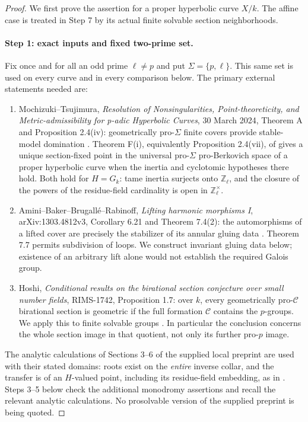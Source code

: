 \begin{proof}
We first prove the assertion for a proper hyperbolic curve
$X/k$. The affine case is treated in Step 7 by its actual
finite solvable section neighborhoods.
\paragraph{Step 1: exact inputs and fixed two-prime set.}

Fix once and for all an odd prime $\ell\ne p$ and put
$\Sigma=\{p,\ell\}$.  This same set is used on every curve and in every
comparison below.  The primary external statements needed are:

\begin{enumerate}
\item Mochizuki--Tsujimura, \emph{Resolution of Nonsingularities,
Point-theoreticity, and Metric-admissibility for p-adic Hyperbolic
Curves}, 30 March 2024, Theorem A and Proposition 2.4(iv):
geometrically pro-$\Sigma$ finite covers provide stable-model domination \cite{MT2024}.
Theorem F(i), equivalently Proposition 2.4(vii), of \cite{MT2024} gives a unique
section-fixed point in the universal pro-$\Sigma$ pro-Berkovich space
of a proper hyperbolic curve when the inertia and cyclotomic hypotheses
there hold.  Both hold for $H=G_k$: tame inertia surjects onto
$\mathbb Z_\ell$, and the closure of the powers of the residue-field
cardinality is open in $\mathbb Z_\ell^\times$.
\item Amini--Baker--Brugall\'e--Rabinoff, \emph{Lifting harmonic
morphisms I}, arXiv:1303.4812v3, Corollary 6.21 and Theorem 7.4(2):
the automorphisms of a lifted cover are precisely the stabilizer of
its annular gluing data \cite{DE_ABBR2015}.  Theorem 7.7 permits subdivision of loops.
We construct invariant gluing data below; existence of an arbitrary
lift alone would not establish the required Galois group.
\item Hoshi, \emph{Conditional results on the birational section
conjecture over small number fields}, RIMS-1742, Proposition 1.7:
over $k$, every geometrically pro-$\mathcal C$ birational section is
geometric if the full formation $\mathcal C$ contains the $p$-groups.
We apply this to finite solvable groups \cite{DE_Hoshi2012}.  In particular the conclusion
concerns the whole section image in that quotient, not only its
further pro-$p$ image.
\end{enumerate}

The analytic calculations of Sections 3--6 of the supplied local
preprint \cite{A_OpenAILocal} are used with their stated domains: roots exist on the
\emph{entire} inverse collar, and the transfer is of an $H$-valued
point, including its residue-field embedding, as in \cite[Fact 5.1.3]{DE_Temkin2010}.  Steps 3--5 below
check the additional monodromy assertions and recall the relevant
analytic calculations.  No prosolvable version of the supplied
preprint is being quoted.


\end{proof}
